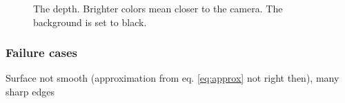 \documentclass{paper}
\begin{document}
\begin{figure}[h!]
\begin{subfigure}{0.3\textwidth}
        \end{subfigure}
        \caption{The depth. Brighter colors mean closer to the camera.
        The background is set to black.}
        \label{fig:depth}
\end{figure}

\subsubsection{Failure cases}
Surface not smooth (approximation from eq. \ref{eq:approx} not right then), many sharp
edges
\end{document}
